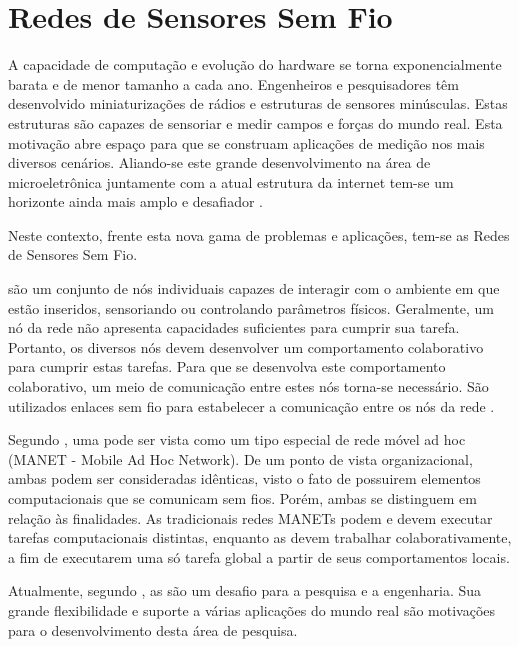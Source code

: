 \section{Redes de Sensores Sem Fio}

A capacidade de computação e evolução do hardware se torna exponencialmente barata e de menor tamanho a cada ano. Engenheiros e pesquisadores têm desenvolvido miniaturizações de rádios e estruturas de sensores minúsculas. Estas estruturas são capazes de sensoriar e medir campos e forças do mundo real. Esta motivação abre espaço para que se construam aplicações de medição nos mais diversos cenários. Aliando-se este grande desenvolvimento na área de microeletrônica juntamente com a atual estrutura da internet tem-se um horizonte ainda mais amplo e desafiador \cite{Culler2004}. 

Neste contexto, frente esta nova gama de problemas e aplicações, tem-se as Redes de Sensores Sem Fio.

\wsn  são um conjunto de nós individuais capazes de interagir com o ambiente em que estão inseridos, sensoriando ou controlando parâmetros físicos.
Geralmente, um nó da rede não apresenta capacidades suficientes para cumprir sua tarefa. Portanto, os diversos nós devem desenvolver um comportamento colaborativo para cumprir estas tarefas. Para que se desenvolva este comportamento colaborativo, um meio de comunicação entre estes nós torna-se necessário. São utilizados enlaces sem fio para estabelecer a comunicação entre os nós da rede \cite{Holger2005}.


Segundo \cite{Loureiro}, uma \rssf pode ser vista como um tipo especial de rede móvel ad hoc (MANET - Mobile Ad Hoc Network). De um ponto de vista organizacional, ambas podem ser consideradas idênticas, visto o fato de possuirem elementos computacionais que se comunicam sem fios. Porém, ambas se distinguem em relação às finalidades. As tradicionais redes MANETs podem e devem executar tarefas computacionais distintas, enquanto as \rssfs devem trabalhar colaborativamente, a fim de executarem uma só tarefa global a partir de seus comportamentos locais.

Atualmente, segundo \cite{Holger2005}, as \rssfs são um desafio para a pesquisa e a engenharia. Sua grande flexibilidade e suporte a várias aplicações do mundo real são motivações para o desenvolvimento desta área de pesquisa.


